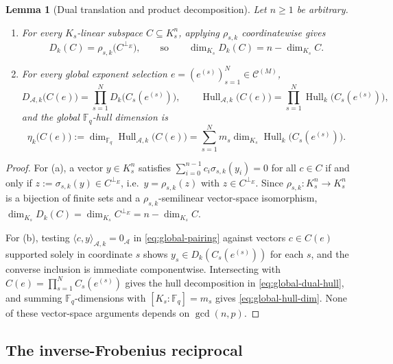 \documentclass[preprint,12pt]{elsarticle}
\newcommand{\F}{\mathbb F}
\newcommand{\A}{\mathcal A}
\newcommand{\Hull}{\operatorname{Hull}}
\newcommand{\perpE}{\perp_E}
\newcommand{\Dk}{D_k}
\numberwithin{equation}{section}
\theoremstyle{plain}
\newtheorem{lemma}[theorem]{Lemma}
\theoremstyle{definition}
\theoremstyle{remark}
\begin{document}
\begin{lemma}[Dual translation and product decomposition]\label{lem:global-duality}
Let $n\ge 1$ be arbitrary.
\begin{enumerate}
\item[\textup{(a)}] For every $K_s$-linear subspace $C\subseteq K_s^n$, applying
$\rho_{s,k}$ coordinatewise gives
\begin{equation}\label{eq:dual-translation}
\Dk(C)=\rho_{s,k}\bigl(C^{\perpE}\bigr),
\qquad\text{so}\qquad
\dim_{K_s}\Dk(C)=n-\dim_{K_s}C.
\end{equation}
\item[\textup{(b)}] For every global exponent selection
$e=(e^{(s)})_{s=1}^{N}\in\mathscr C^{(M)}$,
\begin{equation}\label{eq:global-dual-hull}
D_{\A,k}\bigl(C(e)\bigr)=\prod_{s=1}^{N}\Dk\bigl(C_s(e^{(s)})\bigr),
\qquad
\Hull_{\A,k}\bigl(C(e)\bigr)=\prod_{s=1}^{N}\Hull_k\bigl(C_s(e^{(s)})\bigr),
\end{equation}
and the global $\F_q$-hull dimension is
\begin{equation}\label{eq:global-hull-dim}
\eta_k\bigl(C(e)\bigr):=\dim_{\F_q}\Hull_{\A,k}\bigl(C(e)\bigr)
 =\sum_{s=1}^{N} m_s\dim_{K_s}\Hull_k\bigl(C_s(e^{(s)})\bigr).
\end{equation}
\end{enumerate}
\end{lemma}

\begin{proof}
For \textup{(a)}, a vector $y\in K_s^n$ satisfies
$\sum_{i=0}^{n-1}c_i\sigma_{s,k}(y_i)=0$ for all $c\in C$ if and only if
$z:=\sigma_{s,k}(y)\in C^{\perpE}$, i.e.\ $y=\rho_{s,k}(z)$ with
$z\in C^{\perpE}$. Since $\rho_{s,k}:K_s^n\to K_s^n$ is a bijection of finite
sets and a $\rho_{s,k}$-semilinear vector-space isomorphism,
$\dim_{K_s}\Dk(C)=\dim_{K_s}C^{\perpE}=n-\dim_{K_s}C$.

For \textup{(b)}, testing $\langle c,y\rangle_{\A,k}=0_\A$ in
\eqref{eq:global-pairing} against vectors $c\in C(e)$ supported solely in
coordinate $s$ shows $y_s\in\Dk(C_s(e^{(s)}))$ for each $s$, and the converse
inclusion is immediate componentwise. Intersecting with
$C(e)=\prod_{s=1}^{N}C_s(e^{(s)})$ gives the hull decomposition in
\eqref{eq:global-dual-hull}, and summing $\F_q$-dimensions with $[K_s:\F_q]=m_s$
gives \eqref{eq:global-hull-dim}. None of these vector-space arguments depends
on $\gcd(n,p)$.
\end{proof}

\subsection{The inverse-Frobenius reciprocal}\label{sec:reciprocal}
\end{document}
